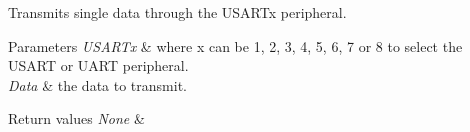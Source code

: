 Transmits single data through the U\+S\+A\+R\+Tx peripheral. 


\begin{DoxyParams}{Parameters}
{\em U\+S\+A\+R\+Tx} & where x can be 1, 2, 3, 4, 5, 6, 7 or 8 to select the U\+S\+A\+RT or U\+A\+RT peripheral. \\
\hline
{\em Data} & the data to transmit. \\
\hline
\end{DoxyParams}

\begin{DoxyRetVals}{Return values}
{\em None} & \\
\hline
\end{DoxyRetVals}
